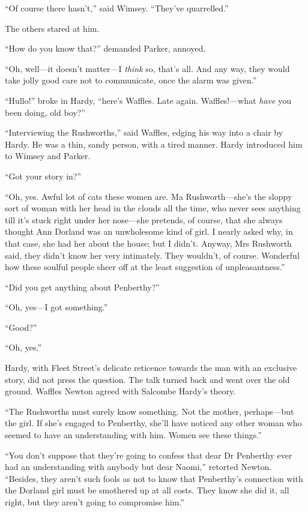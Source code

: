 \enquote{Of course there hasn't,} said Wimsey. \enquote{They've quarrelled.}

The others stared at him.

\enquote{How do you know that?} demanded Parker, annoyed.

\enquote{Oh, well\allowbreak---\allowbreak it doesn't matter\allowbreak---\allowbreak I \textit{think} so, that's all. And any way, they would take jolly good care not to communicate, once the alarm was given.}

\enquote{Hullo!} broke in Hardy, \enquote{here's Waffles. Late again. Waffles!---what \textit{have} you been doing, old boy?}

\enquote{Interviewing the Rushworths,} said Waffles, edging his way into a chair by Hardy. He was a thin, sandy person, with a tired manner. Hardy introduced him to Wimsey and Parker.

\enquote{Got your story in?}

\enquote{Oh, yes. Awful lot of cats these women are. Ma Rushworth\allowbreak---\allowbreak she's the sloppy sort of woman with her head in the clouds all the time, who never sees anything till it's stuck right under her nose\allowbreak---\allowbreak she pretends, of course, that she always thought Ann Dorland was an unwholesome kind of girl. I nearly asked why, in that case, she had her about the house; but I didn't. Anyway, Mrs Rushworth said, they didn't know her very intimately. They wouldn't, of course. Wonderful how these soulful people sheer off at the least suggestion of unpleasantness.}

\enquote{Did you get anything about Penberthy?}

\enquote{Oh, yes\allowbreak---\allowbreak I got something.}

\enquote{Good?}

\enquote{Oh, yes.}

Hardy, with Fleet Street's delicate reticence towards the man with an exclusive story, did not press the question. The talk turned back and went over the old ground. Waffles Newton agreed with Salcombe Hardy's theory.

\enquote{The Rushworths must surely know something. Not the mother, perhaps\allowbreak---\allowbreak but the girl. If she's engaged to Penberthy, she'll have noticed any other woman who seemed to have an understanding with him. Women see these things.}

\enquote{You don't suppose that they're going to confess that dear Dr Penberthy ever had an understanding with anybody but dear Naomi,} retorted Newton. \enquote{Besides, they aren't such fools as not to know that Penberthy's connection with the Dorland girl must be smothered up at all costs. They know she did it, all right, but they aren't going to compromise him.}


